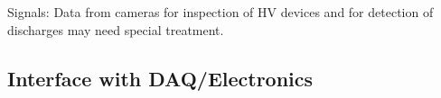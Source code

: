 Signals: Data from cameras for inspection of HV devices and for detection of discharges may need special treatment. 


\subsection{Interface with DAQ/Electronics}
\label{sec:fdsp-slow-cryo-slow-daq}














